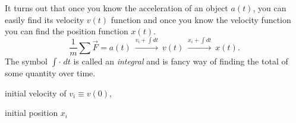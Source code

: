 It turns out that once you know the acceleration of an object $a(t)$, 
you can easily find its velocity $v(t)$ function and once you know the velocity 
function you can find the position function $x(t)$.
\begin{equation}
 \frac{1}{m}\sum \vec{F} = a(t) \ \overset{v_i+ \int\!dt }{\longrightarrow} \ v(t) \ \overset{x_i+ \int\!dt }{\longrightarrow} \ x(t).
 \label{fma-eqn}
\end{equation}
The symbol $\int \cdot \;dt$ is called an \emph{integral} and is fancy way of finding the total
of some quantity over time. 

initial velocity of $v_i \equiv v(0)$,

initial position $x_i$





